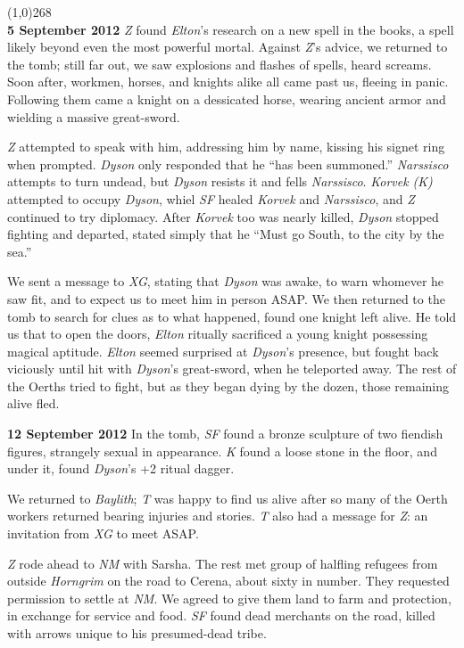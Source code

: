 \documentclass[letterpaper]{article}
\newcommand{\colline}{\noindent\line(1,0){268} \\}
\newcommand{\e}[1]{\emph{#1}}
\newcommand{\B}[1]{\textbf{#1}}
\newenvironment{notesection}[1]
{\noindent {\huge \B{#1}} \par
\vspace{-0.75em}
\colline
\begingroup\fontsize{9pt}{12pt}\selectfont}
{\endgroup}
\begin{document}
\begin{notesection}{Events}
\B{5 September 2012} \e{Z} found \e{Elton}'s research on a new spell in the books, a spell likely beyond even the most powerful mortal. Against \e{Z}'s advice, we returned to the tomb; still far out, we saw explosions and flashes of spells, heard screams. Soon after, workmen, horses, and knights alike all came past us, fleeing in panic. Following them came a knight on a dessicated horse, wearing ancient armor and wielding a massive great-sword.

\e{Z} attempted to speak with him, addressing him by name, kissing his signet ring when prompted.  \e{Dyson} only responded that he ``has been summoned.'' \e{Narssisco} attempts to turn undead, but \e{Dyson} resists it and fells \e{Narssisco}. \e{Korvek (K)} attempted to occupy \e{Dyson}, whiel \e{SF} healed \e{Korvek} and \e{Narssisco}, and \e{Z} continued to try diplomacy. After \e{Korvek} too was nearly killed, \e{Dyson} stopped fighting and departed, stated simply that he ``Must go South, to the city by the sea.''

We sent a message to \e{XG}, stating that \e{Dyson} was awake, to warn whomever he saw fit, and to expect us to meet him in person ASAP. We then returned to the tomb to search for clues as to what happened, found one knight left alive. He told us that to open the doors, \e{Elton} ritually sacrificed a young knight possessing magical aptitude. \e{Elton} seemed surprised at \e{Dyson}'s presence, but fought back viciously until hit with \e{Dyson}'s great-sword, when he teleported away. The rest of the Oerths tried to fight, but as they began dying by the dozen, those remaining alive fled.

\B{12 September 2012} In the tomb, \e{SF} found a bronze sculpture of two fiendish figures, strangely sexual in appearance. \e{K} found a loose stone in the floor, and under it, found \e{Dyson}'s +2 ritual dagger.

We returned to \e{Baylith}; \e{T} was happy to find us alive after so many of the Oerth workers returned bearing injuries and stories. \e{T} also had a message for \e{Z}: an invitation from \e{XG} to meet ASAP.

\e{Z} rode ahead to \e{NM} with Sarsha. The rest met group of halfling refugees from outside \e{Horngrim} on the road to Cerena, about sixty in number. They requested permission to settle at \e{NM}. We agreed to give them land to farm and protection, in exchange for service and food. \e{SF} found dead merchants on the road, killed with arrows unique to his presumed-dead tribe.


\end{notesection}
\end{document}
